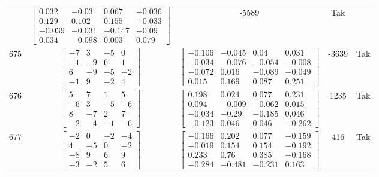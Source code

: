 \documentclass[a4paper,12pt]{article}
\begin{document}
\begin{tabular}{c c c c c}
&
$\begin{bmatrix} 0.032 & -0.03 & 0.067 & -0.036 \\ 0.129 & 0.102 & 0.155 & -0.033 \\ -0.039 & -0.031 & -0.147 & -0.09 \\ 0.034 & -0.098 & 0.003 & 0.079 \end{bmatrix}$
&
-5589
&
Tak
\\
675
&
$\begin{bmatrix} -7 & 3 & -5 & 0 \\ -1 & -9 & 6 & 1 \\ 6 & -9 & -5 & -2 \\ -1 & 9 & -2 & 4 \end{bmatrix}$
&
$\begin{bmatrix} -0.106 & -0.045 & 0.04 & 0.031 \\ -0.034 & -0.076 & -0.054 & -0.008 \\ -0.072 & 0.016 & -0.089 & -0.049 \\ 0.015 & 0.169 & 0.087 & 0.251 \end{bmatrix}$
&
-3639
&
Tak
\\
676
&
$\begin{bmatrix} 5 & 7 & 1 & 5 \\ -6 & 3 & -5 & -6 \\ 8 & -7 & 2 & 7 \\ -2 & -4 & -1 & -6 \end{bmatrix}$
&
$\begin{bmatrix} 0.198 & 0.024 & 0.077 & 0.231 \\ 0.094 & -0.009 & -0.062 & 0.015 \\ -0.034 & -0.29 & -0.185 & 0.046 \\ -0.123 & 0.046 & 0.046 & -0.262 \end{bmatrix}$
&
1235
&
Tak
\\
677
&
$\begin{bmatrix} -2 & 0 & -2 & -4 \\ 4 & -5 & 0 & -2 \\ -8 & 9 & 6 & 9 \\ -3 & -2 & 5 & 6 \end{bmatrix}$
&
$\begin{bmatrix} -0.166 & 0.202 & 0.077 & -0.159 \\ -0.019 & 0.154 & 0.154 & -0.192 \\ 0.233 & 0.76 & 0.385 & -0.168 \\ -0.284 & -0.481 & -0.231 & 0.163 \end{bmatrix}$
&
416
&
Tak
\\

\end{tabular}
\end{document}
